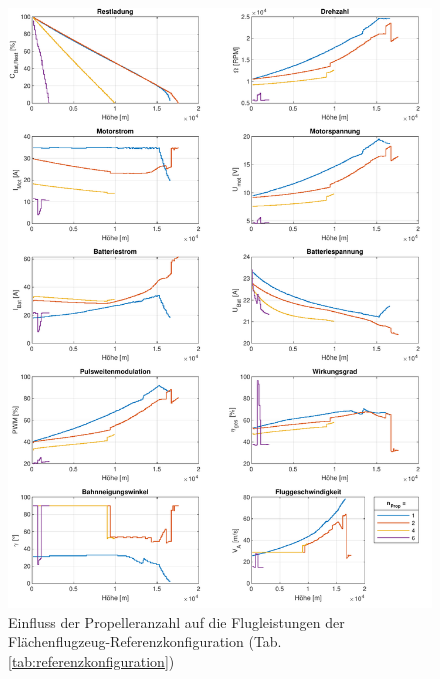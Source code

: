 \begin{figure}[H]
\centering
	\includegraphics[scale=0.7]{Diagramme/Flaechenflzg_n_prop.pdf}
	\caption{Einfluss der Propelleranzahl auf die Flugleistungen der Flächenflugzeug-Referenzkonfiguration (Tab. \ref{tab:referenzkonfiguration})}
	\label{abb:flaechenflzg_n_prop}
\end{figure}


